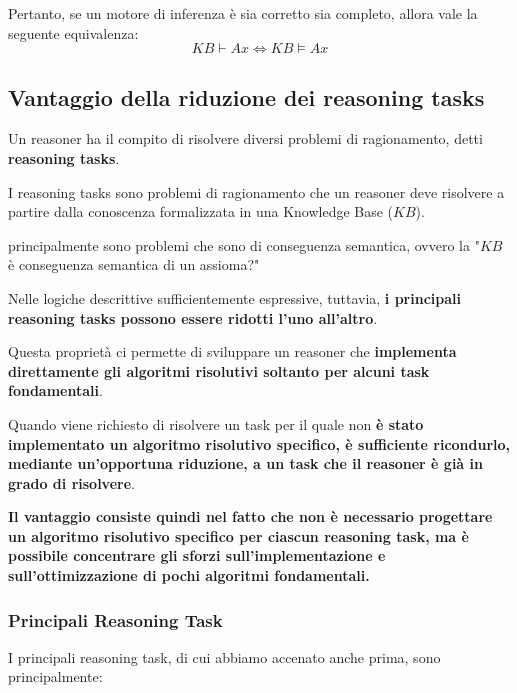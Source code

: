 Pertanto, se un motore di inferenza è sia corretto sia completo,
allora vale la seguente equivalenza:
\[
    \boxed{KB \vdash Ax \iff KB \models Ax}
\]


\subsection{Vantaggio della riduzione dei reasoning tasks}
    Un reasoner ha il compito di risolvere diversi problemi di
    ragionamento, detti \textbf{reasoning tasks}.

    I reasoning tasks sono problemi di ragionamento che un reasoner deve risolvere a partire dalla conoscenza formalizzata in una Knowledge Base (\(KB\)).

    principalmente sono problemi che sono di conseguenza semantica, ovvero la "$KB$ è conseguenza semantica di un assioma?"

    Nelle logiche descrittive sufficientemente espressive,
    tuttavia, \textbf{i principali reasoning tasks possono essere
    ridotti l'uno all'altro}.

    Questa proprietà ci permette di sviluppare un reasoner
    che \textbf{implementa direttamente gli algoritmi risolutivi
    soltanto per alcuni task fondamentali}.

    Quando viene richiesto di risolvere un task per il quale
    non \textbf{è stato implementato un algoritmo risolutivo specifico,
    è sufficiente ricondurlo, mediante un'opportuna riduzione,
    a un task che il reasoner è già in grado di risolvere}.

    \textbf{Il vantaggio consiste quindi nel fatto che non è
    necessario progettare un algoritmo risolutivo specifico
    per ciascun reasoning task, ma è possibile concentrare
    gli sforzi sull'implementazione e sull'ottimizzazione
    di pochi algoritmi fondamentali.}



\newpage
\subsubsection{Principali Reasoning Task}
I principali reasoning task, di cui abbiamo accenato anche prima, sono principalmente:


